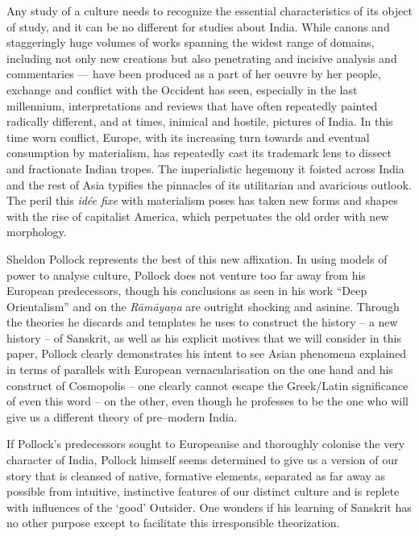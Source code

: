 Any study of a culture needs to recognize the essential characteristics of its object of study, and it can be no different for studies about India. While canons and staggeringly huge volumes of works spanning the widest range of domains, including not only new creations but also penetrating and incisive analysis and commentaries — have been produced as a part of her oeuvre by her people, exchange and conflict with the Occident has seen, especially in the last millennium, interpretations and reviews that have often repeatedly painted radically different, and at times, inimical and hostile, pictures of India. In this time worn conflict, Europe, with its increasing turn towards and eventual consumption by materialism, has repeatedly cast its trademark lens to dissect and fractionate Indian tropes. The imperialistic hegemony it foisted across India and the rest of Asia typifies the pinnacles of its utilitarian and avaricious outlook. The peril this \textit{idée fixe} with materialism poses has taken new forms and shapes with the rise of capitalist America, which perpetuates the old order with new morphology.

Sheldon Pollock represents the best of this new affixation. In using models of power to analyse culture, Pollock does not venture too far away from his European predecessors, though his conclusions as seen in his work “Deep Orientalism” and on the \textit{Rāmāyaṇa} are outright shocking and asinine. Through the theories he discards and templates he uses to construct the history – a new history – of Sanskrit, as well as his explicit motives that we will consider in this paper, Pollock clearly demonstrates his intent to see Asian phenomena explained in terms of parallels with European vernacularisation on the one hand and his construct of Cosmopolis – one clearly cannot escape the Greek/Latin significance of even this word – on the other, even though he professes to be the one who will give us a different theory of pre–modern India.

If Pollock’s predecessors sought to Europeanise and thoroughly colonise the very character of India, Pollock himself seems determined to give us a version of our story that is cleansed of native, formative elements, separated as far away as possible from intuitive, instinctive features of our distinct culture and is replete with influences of the ‘good’ Outsider. One wonders if his learning of Sanskrit has no other purpose except to facilitate this irresponsible theorization.

